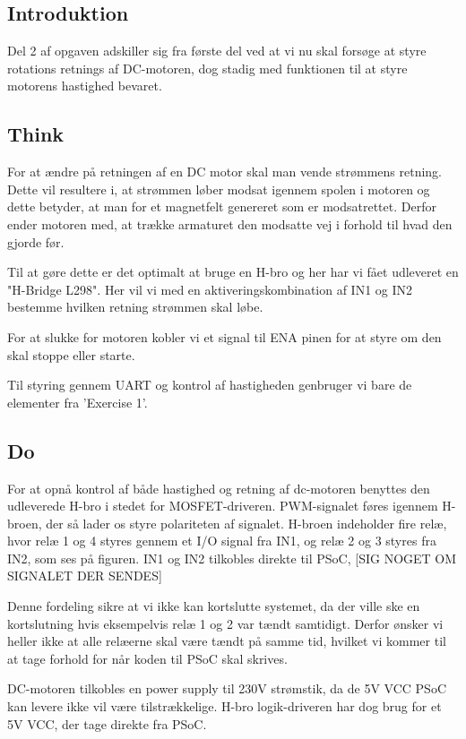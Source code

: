 \documentclass[../main.tex]{subfiles}
\begin{document}
\subsection{Introduktion}
Del 2 af opgaven adskiller sig fra første del ved at vi nu skal forsøge at styre rotations retnings af DC-motoren, dog stadig med funktionen til at styre motorens hastighed bevaret.

\subsection{Think}
For at ændre på retningen af en DC motor skal man vende strømmens retning. 
Dette vil resultere i, at strømmen løber modsat igennem spolen i motoren og dette betyder, at man for et magnetfelt genereret som er modsatrettet.
Derfor ender motoren med, at trække armaturet den modsatte vej i forhold til hvad den gjorde før.

Til at gøre dette er det optimalt at bruge en H-bro og her har vi fået udleveret en "H-Bridge L298".
Her vil vi med en aktiveringskombination af IN1 og IN2 bestemme hvilken retning strømmen skal løbe.

For at slukke for motoren kobler vi et signal til ENA pinen for at styre om den skal stoppe eller starte.

Til styring gennem UART og kontrol af hastigheden genbruger vi bare de elementer fra 'Exercise 1'.

\subsection{Do}
For at opnå kontrol af både hastighed og retning af dc-motoren benyttes den udleverede H-bro i stedet for MOSFET-driveren. PWM-signalet føres igennem H-broen, der så lader os styre polariteten af signalet. H-broen indeholder fire relæ, hvor relæ 1 og 4 styres gennem et I/O signal fra IN1, og relæ 2 og 3 styres fra IN2, som ses på figuren. IN1 og IN2 tilkobles direkte til PSoC, [SIG NOGET OM SIGNALET DER SENDES]


Denne fordeling sikre at vi ikke kan kortslutte systemet, da der ville ske en kortslutning hvis eksempelvis relæ 1 og 2 var tændt samtidigt. Derfor ønsker vi heller ikke at alle relæerne skal være tændt på samme tid, hvilket vi kommer til at tage forhold for når koden til PSoC skal skrives. 

DC-motoren tilkobles en power supply til 230V strømstik, da de 5V VCC PSoC kan levere ikke vil være tilstrækkelige. H-bro logik-driveren har dog brug for et 5V VCC, der tage direkte fra PSoC.
\end{document}
